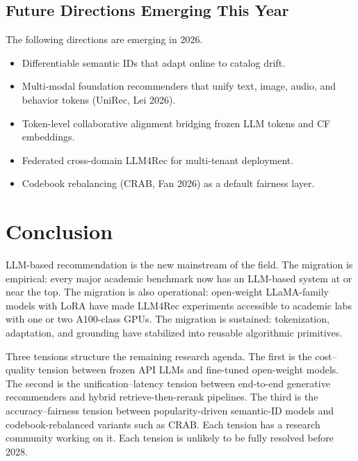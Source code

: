 \documentclass{article}
\begin{document}
\subsection{Future Directions Emerging This Year}\label{future-directions-emerging-this-year}

The following directions are emerging in 2026.

\begin{itemize}

\item
  Differentiable semantic IDs \citep{fu2026differentiablesema} that adapt online to catalog drift.
\item
  Multi-modal foundation recommenders that unify text, image, audio, and behavior tokens (UniRec, Lei 2026).
\item
  Token-level collaborative alignment \citep{lin2026tokenlevelcollabor} bridging frozen LLM tokens and CF embeddings.
\item
  Federated cross-domain LLM4Rec \citep{qin2025federatedcrossdoma} for multi-tenant deployment.
\item
  Codebook rebalancing (CRAB, Fan 2026) as a default fairness layer.
\end{itemize}

\section{Conclusion}\label{conclusion}

LLM-based recommendation is the new mainstream of the field. The migration is empirical: every major academic benchmark now has an LLM-based system at or near the top. The migration is also operational: open-weight LLaMA-family models with LoRA have made LLM4Rec experiments accessible to academic labs with one or two A100-class GPUs. The migration is sustained: tokenization, adaptation, and grounding have stabilized into reusable algorithmic primitives.

Three tensions structure the remaining research agenda. The first is the cost--quality tension between frozen API LLMs and fine-tuned open-weight models. The second is the unification--latency tension between end-to-end generative recommenders and hybrid retrieve-then-rerank pipelines. The third is the accuracy--fairness tension between popularity-driven semantic-ID models and codebook-rebalanced variants such as CRAB. Each tension has a research community working on it. Each tension is unlikely to be fully resolved before 2028.
\end{document}
